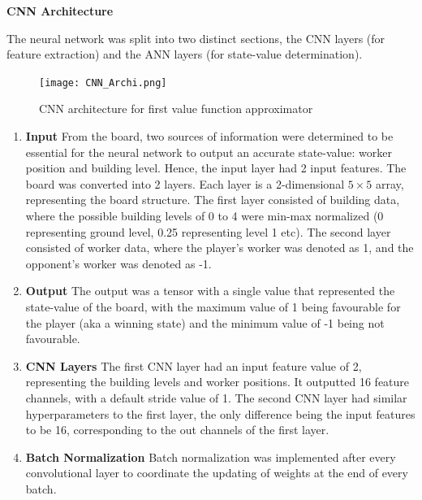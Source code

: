 \documentclass[a4paper,12pt,table]{article}
\begin{document}
\textbf{CNN Architecture} 

The neural network was split into two distinct sections, the CNN layers (for feature extraction) and the ANN layers (for state-value determination).   \par

\begin{figure}[H]
    \begin{center}
        \texttt{[image: CNN\_Archi.png]}
        \caption{CNN architecture for first value function approximator}
        \label{fig:}
    \end{center}
\end{figure}

\begin{enumerate}
    
    \item \textbf{Input}
    \newline
    From the board, two sources of information were determined to be essential for the neural network to output an accurate state-value: worker position and building level. Hence, the input layer had 2 input features. The board was converted into 2 layers. Each layer is a 2-dimensional $5\times5$ array, representing the board structure. The first layer consisted of building data, where the possible building levels of 0 to 4 were min-max normalized (0 representing ground level, 0.25 representing level 1 etc). The second layer consisted of worker data, where the player’s worker was denoted as 1, and the opponent’s worker was denoted as -1. 
    
    \item \textbf{Output}
    \newline
    The output was a tensor with a single value that represented the state-value of the board, with the maximum value of 1 being favourable for the player (aka a winning state) and the minimum value of -1 being not favourable.
    
    \item \textbf{CNN Layers}
    \newline
    The first CNN layer had an input feature value of 2, representing the building levels and worker positions. It outputted 16 feature channels, with a default stride value of 1. The second CNN layer had similar hyperparameters to the first layer, the only difference being the input features to be 16, corresponding to the out channels of the first layer.
    
    \item \textbf{Batch Normalization}
    \newline
    Batch normalization was implemented after every convolutional layer to coordinate the updating of weights at the end of every batch.
    

\end{enumerate}
\end{document}
